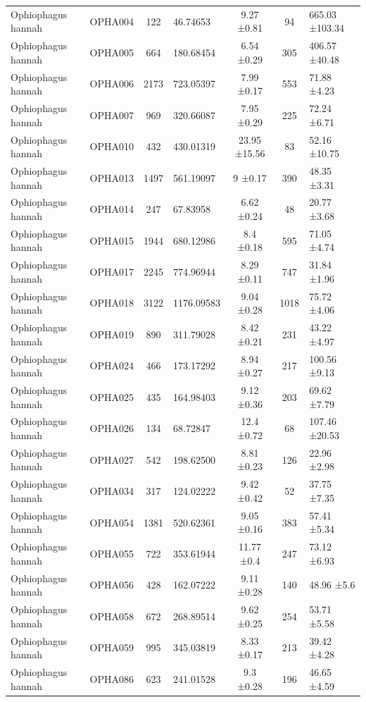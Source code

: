 \documentclass[10pt,a4paper]{article}
\begin{document}
\begin{table}[!h]
{\begin{tabular}[t]{lcclccl}
Ophiophagus hannah & OPHA004 & 122 & 46.74653 & 9.27 ±0.81 & 94 & 665.03 ±103.34\\
Ophiophagus hannah & OPHA005 & 664 & 180.68454 & 6.54 ±0.29 & 305 & 406.57 ±40.48\\
Ophiophagus hannah & OPHA006 & 2173 & 723.05397 & 7.99 ±0.17 & 553 & 71.88 ±4.23\\
Ophiophagus hannah & OPHA007 & 969 & 320.66087 & 7.95 ±0.29 & 225 & 72.24 ±6.71\\
Ophiophagus hannah & OPHA010 & 432 & 430.01319 & 23.95 ±15.56 & 83 & 52.16 ±10.75\\
Ophiophagus hannah & OPHA013 & 1497 & 561.19097 & 9 ±0.17 & 390 & 48.35 ±3.31\\
Ophiophagus hannah & OPHA014 & 247 & 67.83958 & 6.62 ±0.24 & 48 & 20.77 ±3.68\\
Ophiophagus hannah & OPHA015 & 1944 & 680.12986 & 8.4 ±0.18 & 595 & 71.05 ±4.74\\
Ophiophagus hannah & OPHA017 & 2245 & 774.96944 & 8.29 ±0.11 & 747 & 31.84 ±1.96\\
Ophiophagus hannah & OPHA018 & 3122 & 1176.09583 & 9.04 ±0.28 & 1018 & 75.72 ±4.06\\
Ophiophagus hannah & OPHA019 & 890 & 311.79028 & 8.42 ±0.21 & 231 & 43.22 ±4.97\\
Ophiophagus hannah & OPHA024 & 466 & 173.17292 & 8.94 ±0.27 & 217 & 100.56 ±9.13\\
Ophiophagus hannah & OPHA025 & 435 & 164.98403 & 9.12 ±0.36 & 203 & 69.62 ±7.79\\
Ophiophagus hannah & OPHA026 & 134 & 68.72847 & 12.4 ±0.72 & 68 & 107.46 ±20.53\\
Ophiophagus hannah & OPHA027 & 542 & 198.62500 & 8.81 ±0.23 & 126 & 22.96 ±2.98\\
Ophiophagus hannah & OPHA034 & 317 & 124.02222 & 9.42 ±0.42 & 52 & 37.75 ±7.35\\
Ophiophagus hannah & OPHA054 & 1381 & 520.62361 & 9.05 ±0.16 & 383 & 57.41 ±5.34\\
Ophiophagus hannah & OPHA055 & 722 & 353.61944 & 11.77 ±0.4 & 247 & 73.12 ±6.93\\
Ophiophagus hannah & OPHA056 & 428 & 162.07222 & 9.11 ±0.28 & 140 & 48.96 ±5.6\\
Ophiophagus hannah & OPHA058 & 672 & 268.89514 & 9.62 ±0.25 & 254 & 53.71 ±5.58\\
Ophiophagus hannah & OPHA059 & 995 & 345.03819 & 8.33 ±0.17 & 213 & 39.42 ±4.28\\
Ophiophagus hannah & OPHA086 & 623 & 241.01528 & 9.3 ±0.28 & 196 & 46.65 ±4.59\\

\end{tabular}}
\end{table}
\end{document}

